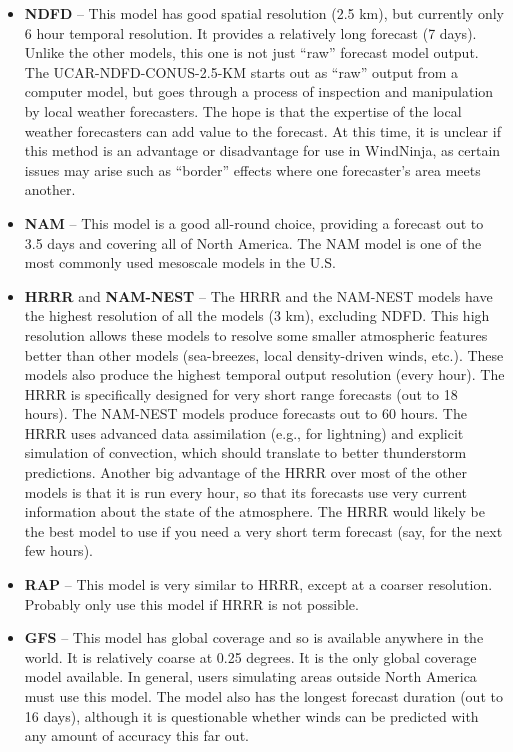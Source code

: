 \documentclass[12pt]{article}
\begin{document}
\begin{itemize}
\item \textbf{NDFD} – This model has good spatial resolution (2.5 km), but currently only 6 hour temporal resolution.  It provides a relatively long forecast (7 days).  Unlike the other models, this one is not just “raw” forecast model output.  The UCAR-NDFD-CONUS-2.5-KM starts out as “raw” output from a computer model, but goes through a process of inspection and manipulation by local weather forecasters.  The hope is that the expertise of the local weather forecasters can add value to the forecast.  At this time, it is unclear if this method is an advantage or disadvantage for use in WindNinja, as certain issues may arise such as “border” effects where one forecaster's area meets another.

\item \textbf{NAM} – This model is a good all-round choice, providing a forecast out to 3.5 days and covering all of North America.  The NAM model is one of the most commonly used mesoscale models in the U.S.

\item \textbf{HRRR} and \textbf{NAM-NEST} – The HRRR and the NAM-NEST models have the highest resolution of all the models (3 km), excluding NDFD. This high resolution allows these models to resolve some smaller atmospheric features better than other models (sea-breezes, local density-driven winds, etc.). These models also produce the highest temporal output resolution (every hour). The HRRR is specifically designed for very short range forecasts (out to 18 hours). The NAM-NEST models produce forecasts out to 60 hours. The HRRR uses advanced data assimilation (e.g., for lightning) and explicit simulation of convection, which should translate to better thunderstorm predictions. Another big advantage of the HRRR over most of the other models is that it is run every hour, so that its forecasts use very current information about the state of the atmosphere.  The HRRR would likely be the best model to use if you need a very short term forecast (say, for the next few hours).

\item \textbf{RAP} – This model is very similar to HRRR, except at a coarser resolution.  Probably only use this model if HRRR is not possible.

\item \textbf{GFS} – This model has global coverage and so is available anywhere in the world.  It is relatively coarse at 0.25 degrees.  It is the only global coverage model available.  In general, users simulating areas outside North America must use this model.  The model also has the longest forecast duration (out to 16 days), although it is questionable whether winds can be predicted with any amount of accuracy this far out.
\end{itemize}
\end{document}
